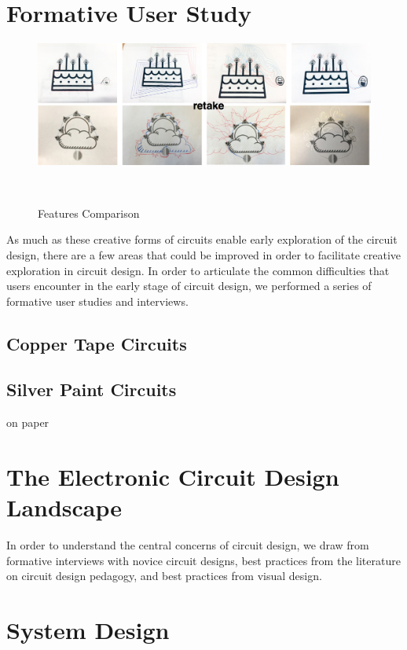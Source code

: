 \documentclass{sigchi}
\begin{document}
\section{Formative User Study}
\begin{figure}
\centering
  \includegraphics[width=1\columnwidth]{figures/formative_user_design}
  \caption{Features Comparison}~\label{fig:formative_user_design}
\end{figure}

As much as these creative forms of circuits enable early exploration of the circuit design, there are a few areas that could be improved in order to facilitate creative exploration in circuit design. In order to articulate the common difficulties that users encounter in the early stage of circuit design, we performed a series of formative user studies and interviews.

\subsection{Copper Tape Circuits}
\subsection{Silver Paint Circuits}
on paper


\section{The Electronic Circuit Design Landscape}
In order to understand the central concerns of circuit design, we draw from formative interviews with novice circuit designs, best practices from the literature on circuit design pedagogy, and best practices from visual design.

\section{System Design}
\end{document}
